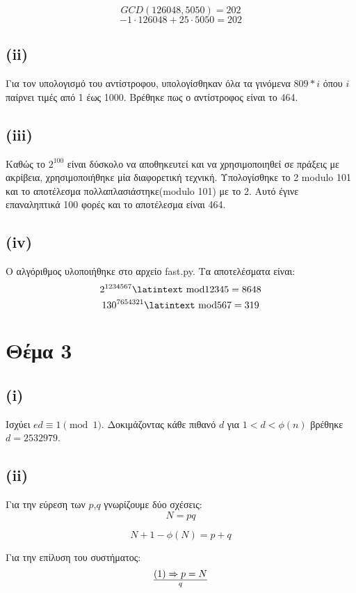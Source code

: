 \documentclass[a4paper, 11pt]{article}
\newcommand{\lt}{\latintext}
\begin{document}
\[GCD(126048, 5050) = 202\]
\[-1 \cdot 126048 + 25 \cdot 5050 = 202\]

\subsection*{({\lt ii})}
Για τον υπολογισμό του αντίστροφου, υπολογίσθηκαν όλα τα γινόμενα $ 809 * i $ όπου $i$ παίρνει τιμές από 1 έως 1000. Βρέθηκε πως ο αντίστροφος είναι το 464.

\subsection*{({\lt iii})}
Καθώς το $2^{100}$ είναι δύσκολο να αποθηκευτεί και να χρησιμοποιηθεί σε πράξεις με ακρίβεια, χρησιμοποιήθηκε μία διαφορετική τεχνική. Υπολογίσθηκε το 2 {\lt modulo} 101 και το αποτέλεσμα πολλαπλασιάστηκε({\lt modulo} 101) με το 2. Αυτό έγινε επαναληπτικά 100 φορές και το αποτέλεσμα είναι 464.

\subsection*{({\lt iv})}
Ο αλγόριθμος υλοποιήθηκε στο αρχείο {\lt fast.py}. Τα αποτελέσματα είναι:
\[2^{1234567} \textrm{\lt mod} 12345 = 8648\]
\[130^{7654321} \textrm{\lt mod} 567 = 319\]
\newpage


\section*{Θέμα 3}
\subsection*{({\lt i})}
Ισχύει $ed \equiv 1 \pmod{1} $. Δοκιμάζοντας κάθε πιθανό $d$ για $1 < d < \phi(n)$ βρέθηκε $d = 2532979$.

\subsection*{({\lt ii})}
Για την εύρεση των $p$,$q$ γνωρίζουμε δύο σχέσεις:
\begin{equation}
N = pq
\end{equation}

\begin{equation}
N + 1 - \phi(N) = p + q
\end{equation}

\noindent Για την επίλυση του συστήματος:
\begin{equation}
(1) \Rightarrow p = N \over q
\end{equation}
\end{document}
